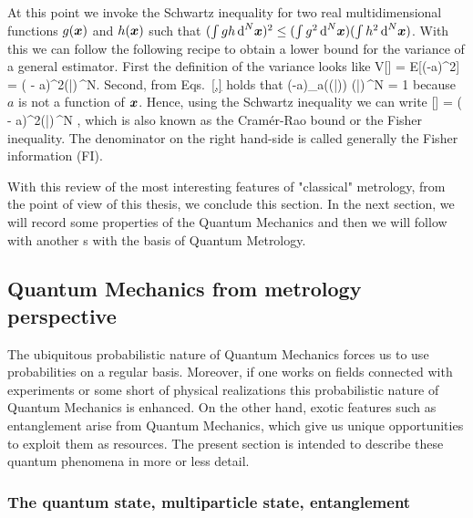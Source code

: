 At this point we invoke the Schwartz inequality for two real multidimensional functions $g(\boldsymbol{x})$ and $h(\boldsymbol{x})$ such that $(\int g h \,\text{d}^N\boldsymbol{x})^2\leq (\int g^2 \,\text{d}^N\boldsymbol{x}) (\int h^2 \,\text{d}^N\boldsymbol{x})$.
With this we can follow the following recipe to obtain a lower bound for the variance of a general estimator.
First the definition of the variance looks like
\be
  V[] = E[(-a)^2] = \int ( - a)^2\prob(|)\,^N.
\ee
Second, from Eqs.~\eqref{,} holds that
\be
  \int (-a)\partial_a\big(\ln  \prob(|)\big) \prob(|)\,^N = 1
\ee
because $a$ is not a function of $\boldsymbol{x}$.
Hence, using the Schwartz inequality we can write
\be
  \label{eq:bg-classical-cr-bound-and-fi}
  [] = \int ( - a)^2\prob(|)\,^N \geq {},
\ee
which is also known as the Cram\'er-Rao bound or the Fisher inequality.
The denominator on the right hand-side is called generally the Fisher information (FI).

With this review of the most interesting features of "classical" metrology, from the point of view of this thesis, we conclude this section.
In the next section, we will record some properties of the Quantum Mechanics and then we will follow with another s with the basis of Quantum Metrology.

\subsection{Quantum Mechanics from metrology perspective}

The ubiquitous probabilistic nature of Quantum Mechanics forces us to use probabilities on a regular basis.
Moreover, if one works on fields connected with experiments or some short of physical realizations this probabilistic nature of Quantum Mechanics is enhanced.
On the other hand, exotic features such as entanglement arise from Quantum Mechanics, which give us unique opportunities to exploit them as resources.
The present section is intended to describe these quantum phenomena in more or less detail.

\subsubsection{The quantum state, multiparticle state, entanglement}

